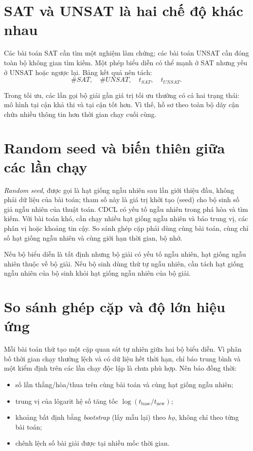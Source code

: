 \section{SAT và UNSAT là hai chế độ khác nhau}

Các bài toán SAT cần tìm một nghiệm làm chứng; các bài toán UNSAT cần đóng toàn bộ
không gian tìm kiếm. Một phép biểu diễn có thể mạnh ở SAT nhưng yếu ở UNSAT hoặc
ngược lại.
Bảng kết quả nên tách:
\[
  \#SAT,\quad \#UNSAT,\quad t_{SAT},\quad t_{UNSAT}.
\]

Trong tối ưu, các lần gọi bộ giải gần giá trị tối ưu thường có cả hai trạng
thái: mô hình tại cận khả thi và \UNSAT tại cận tốt hơn. Vì thế, hồ sơ theo
toàn bộ dãy cận chứa nhiều thông tin hơn thời gian chạy cuối cùng.

\section{Random seed và biến thiên giữa các lần chạy}

\emph{Random seed}, được gọi là hạt giống ngẫu nhiên sau lần giới thiệu đầu,
không phải dữ liệu của bài toán; tham số này là giá trị khởi tạo (seed) cho bộ sinh số giả ngẫu nhiên
của thuật toán. CDCL có yếu tố ngẫu nhiên trong phá hòa và tìm kiếm. Với bài
toán khó, cần chạy nhiều hạt giống ngẫu nhiên và báo trung vị, các phân vị hoặc
khoảng tin cậy. So sánh ghép cặp phải dùng cùng bài toán, cùng chỉ số hạt giống
ngẫu nhiên và cùng giới hạn thời gian, bộ nhớ.

Nếu bộ biểu diễn là tất định nhưng bộ giải có yếu tố ngẫu nhiên, hạt giống ngẫu
nhiên thuộc về bộ giải. Nếu bộ sinh dùng thứ tự ngẫu nhiên, cần tách hạt giống
ngẫu nhiên của bộ sinh khỏi hạt giống ngẫu nhiên của bộ giải.

\section{So sánh ghép cặp và độ lớn hiệu ứng}

Mỗi bài toán thử tạo một cặp quan sát tự nhiên giữa hai bộ biểu diễn. Vì phân bố
thời gian chạy thường lệch và có dữ liệu hết thời hạn, chỉ báo trung bình và
một kiểm định trên các lần chạy độc lập là chưa phù hợp. Nên báo đồng thời:
\begin{itemize}
  \item số lần thắng/hòa/thua trên cùng bài toán và cùng hạt giống ngẫu nhiên;
  \item trung vị của lôgarit hệ số tăng tốc
        \(\log(t_{\mathrm{base}}/t_{\mathrm{new}})\);
  \item khoảng bất định bằng \emph{bootstrap} (lấy mẫu lại) theo \emph{họ}, không chỉ
        theo từng bài toán;
  \item chênh lệch số bài giải được tại nhiều mốc thời gian.
\end{itemize}

